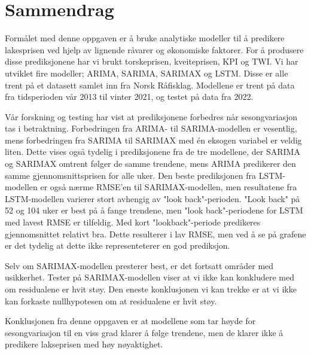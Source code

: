 \section*{Sammendrag}
Formålet med denne oppgaven er å bruke analytiske modeller til å predikere lakesprisen ved hjelp av lignende råvarer og økonomiske faktorer. For å produsere disse prediksjonene har vi brukt torskeprisen, kveiteprisen, KPI og TWI. Vi har utviklet fire modeller; ARIMA, SARIMA, SARIMAX og LSTM. Disse er alle trent på et datasett samlet inn fra Norsk Råfisklag. Modellene er trent på data fra tidsperioden vår 2013 til vinter 2021, og testet på data fra 2022.

Vår forskning og testing har vist at prediksjonene forbedres når sesongvariasjon tas i betraktning. Forbedringen fra ARIMA- til SARIMA-modellen er vesentlig, mens forbedringen fra SARIMA til SARIMAX med én eksogen variabel er veldig liten. Dette vises også tydelig i prediksjonene fra de tre modellene, der SARIMA og SARIMAX omtrent følger de samme trendene, mens ARIMA predikerer den samme gjennomsnittsprisen for alle uker. Den beste prediksjonen fra LSTM-modellen er også nærme RMSE'en til SARIMAX-modellen, men resultatene fra LSTM-modellen varierer stort avhengig av "look back"-perioden. "Look back" på 52 og 104 uker er best på å fange trendene, men "look back"-periodene for LSTM med lavest RMSE er tilfeldig. Med kort "lookback"-periode predikeres gjennomsnittet relativt bra. Dette resulterer i lav RMSE, men ved å se på grafene er det tydelig at dette ikke representeterer en god prediksjon. 

Selv om SARIMAX-modellen presterer best, er det fortsatt områder med usikkerhet. Tester på SARIMAX-modellen viser at vi ikke kan konkludere med om residualene er hvit støy. Den eneste konklusjonen vi kan trekke er at vi ikke kan forkaste nullhypotesen om at residualene er hvit støy.

Konklusjonen fra denne oppgaven er at modellene som tar høyde for sesongvariasjon til en viss grad klarer å følge trendene, men de klarer ikke å predikere lakseprisen med høy nøyaktighet. 

